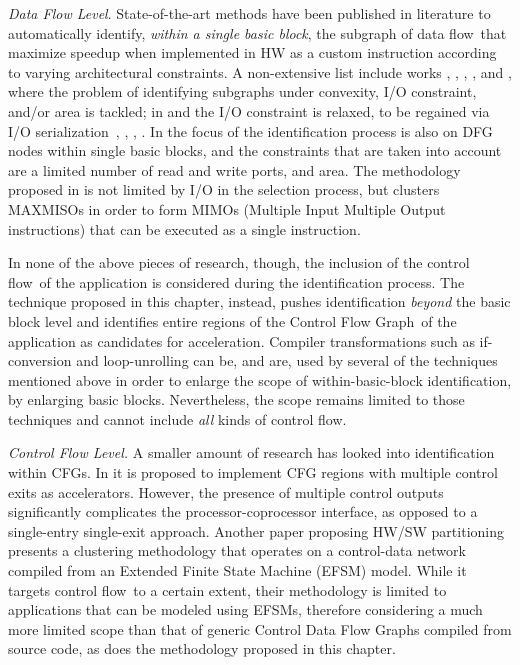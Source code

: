 \documentclass[]{usiinfthesis}
\newcommand{\dataflow}{data flow}
\newcommand{\controlflow}{control flow}
\newcommand{\CFG}{Control Flow Graph}
\begin{document}
\emph{Data Flow Level}.
State-of-the-art methods have been
published in literature to automatically identify,
\emph{within a single basic block}, the subgraph of \dataflow\  
that maximize speedup when implemented in HW as a custom instruction
according to varying architectural constraints. A non-extensive list
include works \cite{YuSep04}, \cite{PozziJul06}, \cite{ChenFeb07},
\cite{ReddingtonAug09}, \cite{GiaquintaMar15} and \cite{MartiFeb12},
where the problem of identifying subgraphs under convexity, I/O
constraint, and/or area is tackled; in \cite{VermaOct07} and
\cite{PothineniJan07} the I/O constraint is relaxed, to be regained
via I/O serialization~\cite{PozziSep05}, \cite{VermaOct07},
\cite{AtasuApr07}, \cite{AhnJan13}. In \cite{CongFeb04} the focus of
the identification process is also on DFG nodes within single basic
blocks, and the constraints that are taken into account are a limited
number of read and write ports, and area.  The methodology proposed in
\cite{GaluzziOct06} is not limited by I/O in the selection process,
but clusters MAXMISOs \cite{AlippiMar99} in order to form MIMOs 
(Multiple Input Multiple Output instructions) that can be executed as 
a single instruction.\par

In none of the above pieces of research, though, the inclusion of the
\controlflow\ of the application is considered during the
identification process. The technique proposed in this chapter, 
instead, pushes 
identification \emph{beyond} the basic block level and identifies 
entire regions of the \CFG\ of the
application as candidates for acceleration. Compiler
transformations such as if-conversion and loop-unrolling can be, and
are, used by several of the techniques mentioned above in order to
enlarge the scope of within-basic-block identification, by enlarging 
basic blocks. Nevertheless, the scope remains limited to those
techniques and cannot include \emph{all} kinds of
\controlflow.\par

\emph{Control Flow Level.}
A smaller amount of research has looked into
identification within CFGs. In \cite{ZuluagaJul09} it is
proposed to implement CFG regions with multiple control exits as
accelerators. However, the presence of multiple control outputs
significantly complicates the processor-coprocessor interface, as
opposed to a single-entry single-exit approach. 
Another paper proposing HW/SW partitioning~\cite{BaleaniMay02}
presents a clustering methodology that operates on a control-data
network compiled from an Extended Finite State Machine (EFSM)
model. While it targets \controlflow\ to a certain extent, their
methodology is limited to applications that can be modeled using
EFSMs, therefore considering a much more limited scope than that of
generic Control Data Flow Graphs compiled from source code, as does 
the methodology proposed in this chapter.
\end{document}
